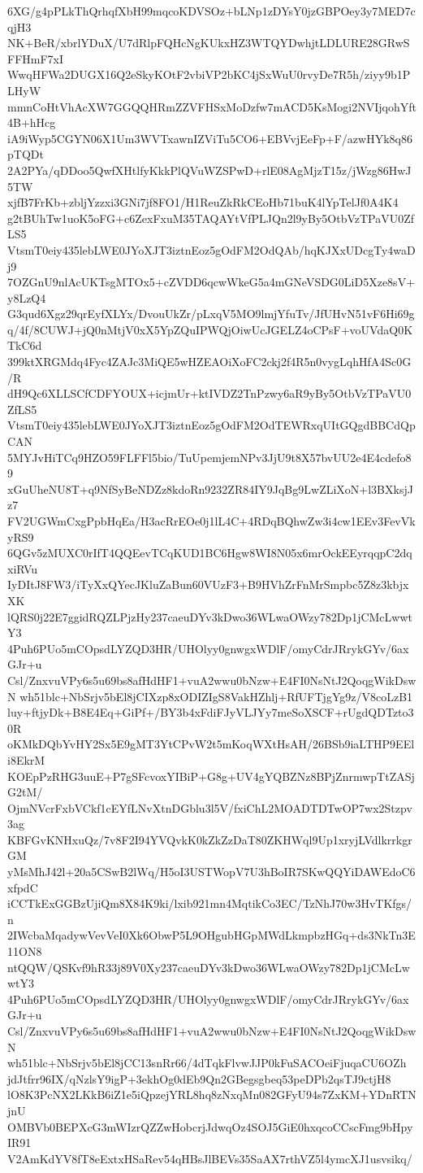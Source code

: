 6XG/g4pPLkThQrhqfXbH99mqcoKDVSOz+bLNp1zDYsY0jzGBPOey3y7MED7cqjH3
NK+BeR/xbrlYDuX/U7dRlpFQHcNgKUkxHZ3WTQYDwhjtLDLURE28GRwSFFHmF7xI
WwqHFWa2DUGX16Q2eSkyKOtF2vbiVP2bKC4jSxWuU0rvyDe7R5h/ziyy9b1PLHyW
mmnCoHtVhAcXW7GGQQHRmZZVFHSxMoDzfw7mACD5KsMogi2NVIjqohYft4B+hHcg
iA9iWyp5CGYN06X1Um3WVTxawnIZViTu5CO6+EBVvjEeFp+F/azwHYk8q86pTQDt
2A2PYa/qDDoo5QwfXHtlfyKkkPlQVuWZSPwD+rlE08AgMjzT15z/jWzg86HwJ5TW
xjfB7FrKb+zbljYzzxi3GNi7jf8FO1/H1ReuZkRkCEoHb71buK4lYpTelJf0A4K4
g2tBUhTw1uoK5oFG+c6ZexFxuM35TAQAYtVfPLJQn2l9yBy5OtbVzTPaVU0ZfLS5
VtsmT0eiy435lebLWE0JYoXJT3iztnEoz5gOdFM2OdQAb/hqKJXxUDcgTy4waDj9
7OZGnU9nlAcUKTsgMTOx5+cZVDD6qcwWkeG5a4mGNeVSDG0LiD5Xze8sV+y8LzQ4
G3qud6Xgz29qrEyfXLYx/DvouUkZr/pLxqV5MO9lmjYfuTv/JfUHvN51vF6Hi69g
q/4f/8CUWJ+jQ0nMtjV0xX5YpZQuIPWQjOiwUcJGELZ4oCPsF+voUVdaQ0KTkC6d
399ktXRGMdq4Fyc4ZAJc3MiQE5wHZEAOiXoFC2ckj2f4R5n0vygLqhHfA4Sc0G/R
dH9Qc6XLLSCfCDFYOUX+icjmUr+ktIVDZ2TnPzwy6aR9yBy5OtbVzTPaVU0ZfLS5
VtsmT0eiy435lebLWE0JYoXJT3iztnEoz5gOdFM2OdTEWRxqUItGQgdBBCdQpCAN
5MYJvHiTCq9HZO59FLFFl5bio/TuUpemjemNPv3JjU9t8X57bvUU2e4E4cdefo89
xGuUheNU8T+q9NfSyBeNDZz8kdoRn9232ZR84IY9JqBg9LwZLiXoN+l3BXksjJz7
FV2UGWmCxgPpbHqEa/H3acRrEOe0j1lL4C+4RDqBQhwZw3i4cw1EEv3FevVkyRS9
6QGv5zMUXC0rIfT4QQEevTCqKUD1BC6Hgw8WI8N05x6mrOckEEyrqqpC2dqxiRVu
IyDItJ8FW3/iTyXxQYecJKluZaBun60VUzF3+B9HVhZrFnMrSmpbc5Z8z3kbjxXK
lQRS0j22E7ggidRQZLPjzHy237caeuDYv3kDwo36WLwaOWzy782Dp1jCMcLwwtY3
4Puh6PUo5mCOpsdLYZQD3HR/UHOlyy0gnwgxWDlF/omyCdrJRrykGYv/6axGJr+u
Csl/ZnxvuVPy6s5u69bs8afHdHF1+vuA2wwu0bNzw+E4FI0NsNtJ2QoqgWikDswN
wh51blc+NbSrjv5bEl8jCIXzp8xODIZIgS8VakHZhlj+RfUFTjgYg9z/V8coLzB1
luy+ftjyDk+B8E4Eq+GiPf+/BY3b4xFdiFJyVLJYy7meSoXSCF+rUgdQDTzto30R
oKMkDQbYvHY2Sx5E9gMT3YtCPvW2t5mKoqWXtHsAH/26BSb9iaLTHP9EEli8EkrM
KOEpPzRHG3uuE+P7gSFcvoxYIBiP+G8g+UV4gYQBZNz8BPjZnrmwpTtZASjG2tM/
OjmNVcrFxbVCkf1cEYfLNvXtnDGblu3l5V/fxiChL2MOADTDTwOP7wx2Stzpv3ag
KBFGvKNHxuQz/7v8F2I94YVQvkK0kZkZzDaT80ZKHWql9Up1xryjLVdlkrrkgrGM
yMsMhJ42l+20a5CSwB2lWq/H5oI3USTWopV7U3hBoIR7SKwQQYiDAWEdoC6xfpdC
iCCTkExGGBzUjiQm8X84K9ki/lxib921mn4MqtikCo3EC/TzNhJ70w3HvTKfgs/n
2IWcbaMqadywVevVeI0Xk6ObwP5L9OHgubHGpMWdLkmpbzHGq+ds3NkTn3E11ON8
ntQQW/QSKvf9hR33j89V0Xy237caeuDYv3kDwo36WLwaOWzy782Dp1jCMcLwwtY3
4Puh6PUo5mCOpsdLYZQD3HR/UHOlyy0gnwgxWDlF/omyCdrJRrykGYv/6axGJr+u
Csl/ZnxvuVPy6s5u69bs8afHdHF1+vuA2wwu0bNzw+E4FI0NsNtJ2QoqgWikDswN
wh51blc+NbSrjv5bEl8jCC13snRr66/4dTqkFlvwJJP0kFuSACOeiFjuqaCU6OZh
jdJtfrr96IX/qNzlsY9igP+3ekhOg0dEb9Qn2GBegsgbeq53peDPb2qsTJ9ctjH8
lO8K3PcNX2LKkB6iZ1e5iQpzejYRL8hq8zNxqMn082GFyU94s7ZxKM+YDnRTNjnU
OMBVb0BEPXcG3mWIzrQZZwHobcrjJdwqOz4SOJ5GiE0hxqcoCCscFmg9bHpyIR91
V2AmKdYV8fT8eExtxHSaRev54qHBsJlBEVs35SaAX7rthVZ5l4ymcXJ1usvsikq/
